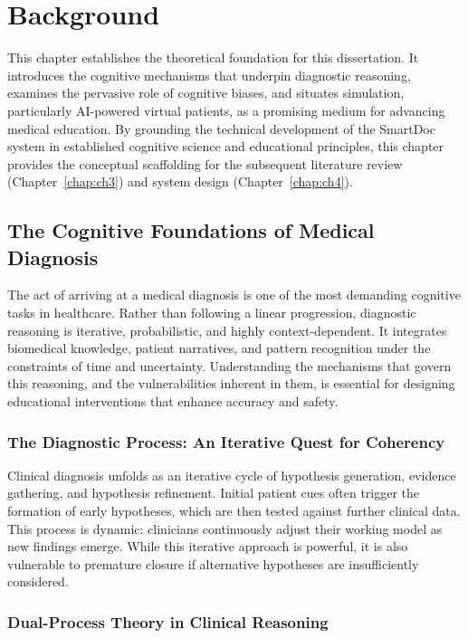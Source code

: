 \chapter{Background} \label{chap:ch2}

This chapter establishes the theoretical foundation for this dissertation. It introduces the cognitive mechanisms that underpin diagnostic reasoning, examines the pervasive role of cognitive biases, and situates simulation, particularly AI-powered virtual patients, as a promising medium for advancing medical education. By grounding the technical development of the SmartDoc system in established cognitive science and educational principles, this chapter provides the conceptual scaffolding for the subsequent literature review (Chapter~\ref{chap:ch3}) and system design (Chapter~\ref{chap:ch4}).

\section{The Cognitive Foundations of Medical Diagnosis}

The act of arriving at a medical diagnosis is one of the most demanding cognitive tasks in healthcare. Rather than following a linear progression, diagnostic reasoning is iterative, probabilistic, and highly context-dependent. It integrates biomedical knowledge, patient narratives, and pattern recognition under the constraints of time and uncertainty. Understanding the mechanisms that govern this reasoning, and the vulnerabilities inherent in them, is essential for designing educational interventions that enhance accuracy and safety.

\subsection{The Diagnostic Process: An Iterative Quest for Coherency} \label{sec:se211}

Clinical diagnosis unfolds as an iterative cycle of hypothesis generation, evidence gathering, and hypothesis refinement. Initial patient cues often trigger the formation of early hypotheses, which are then tested against further clinical data. This process is dynamic: clinicians continuously adjust their working model as new findings emerge. While this iterative approach is powerful, it is also vulnerable to premature closure if alternative hypotheses are insufficiently considered.

\subsection{Dual-Process Theory in Clinical Reasoning} \label{sec:se311}

